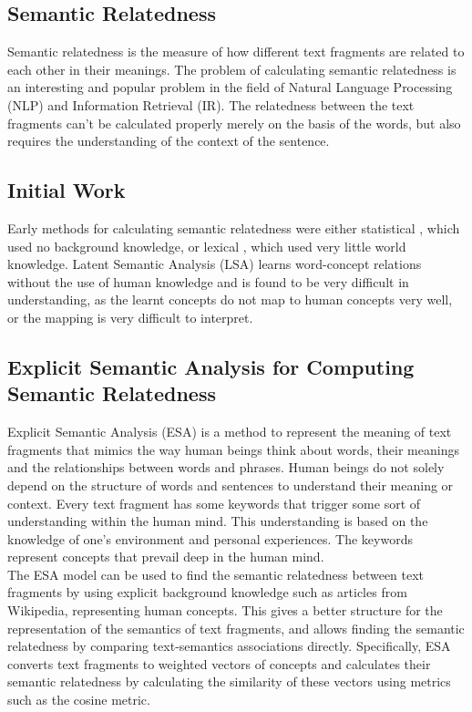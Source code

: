 \documentclass[journal,transmag]{IEEEtran}
\begin{document}
\subsection {\textbf{Semantic Relatedness}}

Semantic relatedness is the measure of how different text fragments are related to each other in their meanings. The problem of calculating semantic relatedness is an interesting and popular problem in the field of Natural Language Processing (NLP) and Information Retrieval (IR). The relatedness between the text fragments can’t be calculated properly merely on the basis of the words, but also requires the understanding of the context of the sentence.

\subsection {\textbf{Initial Work}}

Early methods for calculating semantic relatedness were either statistical \cite{statistical, LSA}, which used no background knowledge, or lexical \cite{lexical}, which used very little world knowledge. Latent Semantic Analysis (LSA) \cite{LSA} learns word-concept relations without the use of human knowledge and is found to be very difficult in understanding, as the learnt concepts do not map to human concepts very well, or the mapping is very difficult to interpret.

\subsection {\textbf{Explicit Semantic Analysis for Computing Semantic Relatedness}}

Explicit Semantic Analysis (ESA) \cite{ESA} is a method to represent the meaning of text fragments that mimics the way human beings think about words, their meanings and the relationships between words and phrases. Human beings do not solely depend on the structure of words and sentences to understand their meaning or context. Every text fragment has some keywords that trigger some sort of understanding within the human mind. This understanding is based on the knowledge of one's environment and personal experiences. The keywords represent concepts that prevail deep in the human mind.\\
The ESA model can be used to find the semantic relatedness between text fragments by using explicit background knowledge such as articles from Wikipedia, representing human concepts. This gives a better structure for the representation of the semantics of text fragments, and allows finding the semantic relatedness by comparing text-semantics associations directly. Specifically, ESA converts text fragments to weighted vectors of concepts and calculates their semantic relatedness by calculating the similarity of these vectors using metrics such as the cosine metric.
\end{document}
